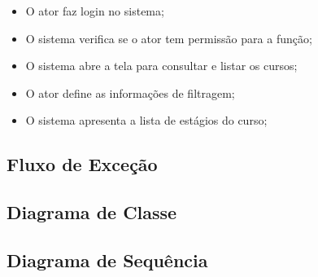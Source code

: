 \begin{itemize}
  \item O ator faz login no sistema;
  \item O sistema verifica se o ator tem permissão para a função;
  \item O sistema abre a tela para consultar e listar os cursos;
  \item O ator define as informações de filtragem;
  \item O sistema apresenta a lista de estágios do curso;
\end{itemize}

\subsection{Fluxo de Exceção}

\subsection{Diagrama de Classe}

\subsection{Diagrama de Sequência}